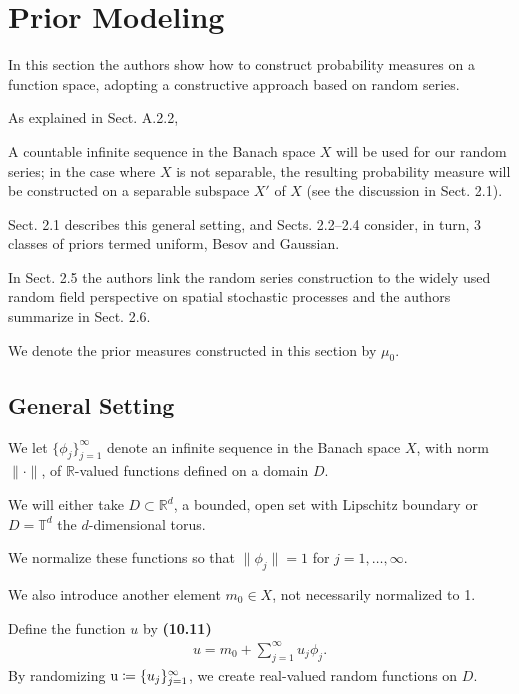 \documentclass[oneside,11pt]{book}
\numberwithin{equation}{section}
\begin{document}

\chapter{Prior Modeling}
In this section the authors show how to construct probability measures on a function space, adopting a constructive approach based on random series.

As explained in Sect. A.2.2, 

A countable infinite sequence in the Banach space $X$ will be used for our random series; in the case where $X$ is not separable, the resulting probability measure will be constructed on a separable subspace $X'$ of $X$ (see the discussion in Sect. 2.1).

%
Sect. 2.1 describes this general setting, and Sects. 2.2--2.4 consider, in turn, 3 classes of priors termed uniform, Besov and Gaussian.

In Sect. 2.5 the authors link the random series construction to the widely used random field perspective on spatial stochastic processes and the authors summarize in Sect. 2.6.

We denote the prior measures constructed in this section by $\mu_0$.

\section{General Setting}
We let $\{\phi_j\}_{j=1}^\infty$ denote an infinite sequence in the Banach space $X$, with norm $\|\cdot\|$, of $\mathbb{R}$-valued functions defined on a domain $D$.

We will either take $D\subset\mathbb{R}^d$, a bounded, open set with Lipschitz boundary or $D = \mathbb{T}^d$ the $d$-dimensional torus.

We normalize these functions so that $\|\phi_j\| = 1$ for $j = 1,\ldots,\infty$.

We also introduce another element $m_0\in X$, not necessarily normalized to 1.

Define the function $u$ by \textbf{(10.11)}
\begin{align*}
    u = m_0 + \sum_{j=1}^\infty u_j\phi_j.
\end{align*}
By randomizing ${\rm u}\coloneqq\{u_j\}_{j=1}^\infty$, we create real-valued random functions on $D$.
\end{document}
